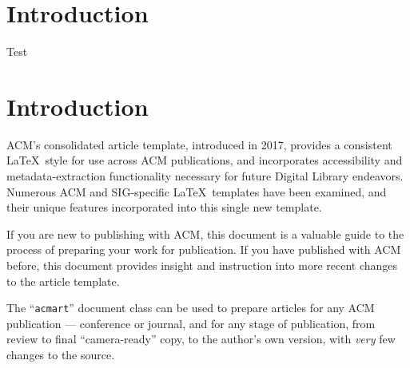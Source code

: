 \documentclass[sigconf]{acmart}
\begin{document}
	
	
	
	
	\maketitle
	
	\section{Introduction}	
	 Test
	
	
	
	
	
	
	
	
	
	
	
	
	
	
	
	
	
	
	
	
	\section{Introduction}
	ACM's consolidated article template, introduced in 2017, provides a consistent \LaTeX\ style for use across ACM publications, and incorporates accessibility and metadata-extraction functionality necessary for future Digital Library endeavors. Numerous ACM and SIG-specific \LaTeX\ templates have been examined, and their unique features incorporated into this single new template.
	
	If you are new to publishing with ACM, this document is a valuable guide to the process of preparing your work for publication. If you have published with ACM before, this document provides insight and instruction into more recent changes to the article template.
	
	The ``\verb|acmart|'' document class can be used to prepare articles for any ACM publication --- conference or journal, and for any stage of publication, from review to final ``camera-ready'' copy, to the author's own version, with {\it very} few changes to the source. 
	
\end{document}

